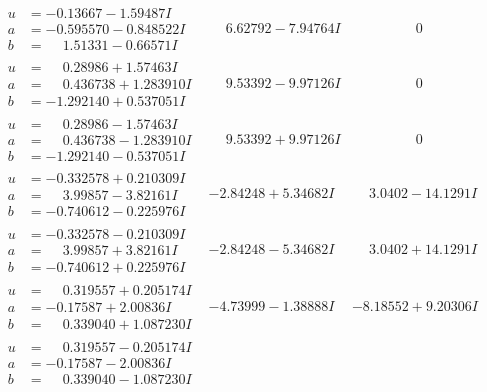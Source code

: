 \documentclass[1p]{elsarticle_modified}
\theoremstyle{definition}
\begin{document}
$$\begin{array}{c|c|c}
 \hline 
\begin{aligned}
u &= -0.13667 - 1.59487 I \\
a &= -0.595570 - 0.848522 I \\
b &= \phantom{-}1.51331 - 0.66571 I\end{aligned}
 & \phantom{-}6.62792 - 7.94764 I & \phantom{-0.000000 } 0 \\ \hline\begin{aligned}
u &= \phantom{-}0.28986 + 1.57463 I \\
a &= \phantom{-}0.436738 + 1.283910 I \\
b &= -1.292140 + 0.537051 I\end{aligned}
 & \phantom{-}9.53392 - 9.97126 I & \phantom{-0.000000 } 0 \\ \hline\begin{aligned}
u &= \phantom{-}0.28986 - 1.57463 I \\
a &= \phantom{-}0.436738 - 1.283910 I \\
b &= -1.292140 - 0.537051 I\end{aligned}
 & \phantom{-}9.53392 + 9.97126 I & \phantom{-0.000000 } 0 \\ \hline\begin{aligned}
u &= -0.332578 + 0.210309 I \\
a &= \phantom{-}3.99857 - 3.82161 I \\
b &= -0.740612 - 0.225976 I\end{aligned}
 & -2.84248 + 5.34682 I & \phantom{-}3.0402 - 14.1291 I \\ \hline\begin{aligned}
u &= -0.332578 - 0.210309 I \\
a &= \phantom{-}3.99857 + 3.82161 I \\
b &= -0.740612 + 0.225976 I\end{aligned}
 & -2.84248 - 5.34682 I & \phantom{-}3.0402 + 14.1291 I \\ \hline\begin{aligned}
u &= \phantom{-}0.319557 + 0.205174 I \\
a &= -0.17587 + 2.00836 I \\
b &= \phantom{-}0.339040 + 1.087230 I\end{aligned}
 & -4.73999 - 1.38888 I & -8.18552 + 9.20306 I \\ \hline\begin{aligned}
u &= \phantom{-}0.319557 - 0.205174 I \\
a &= -0.17587 - 2.00836 I \\
b &= \phantom{-}0.339040 - 1.087230 I\end{aligned}

\end{array}$$
\end{document}
